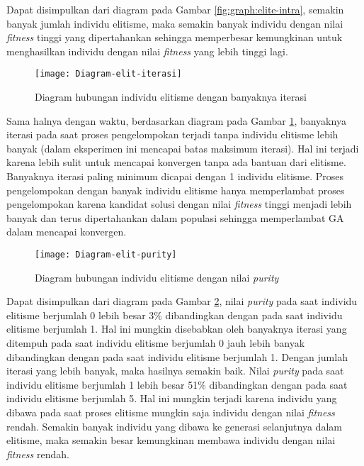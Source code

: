 \begin{enumerate}
		Dapat disimpulkan dari diagram pada Gambar \ref{fig:graph:elite-intra}, semakin banyak jumlah individu elitisme, maka semakin banyak individu dengan nilai \textit{fitness} tinggi yang dipertahankan sehingga memperbesar kemungkinan untuk menghasilkan individu dengan nilai \textit{fitness} yang lebih tinggi lagi.
		
		\begin{figure}[H]
			\centering
			\texttt{[image: Diagram-elit-iterasi]}
			\caption{Diagram hubungan individu elitisme dengan banyaknya iterasi}
			\label{fig:graph:elite-iteration}
		\end{figure}
		
		Sama halnya dengan waktu, berdasarkan diagram pada Gambar \ref{fig:graph:elite-iteration}, banyaknya iterasi pada saat proses pengelompokan terjadi tanpa individu elitisme lebih banyak (dalam eksperimen ini mencapai batas maksimum iterasi). Hal ini terjadi karena lebih sulit untuk mencapai konvergen tanpa ada bantuan dari elitisme. Banyaknya iterasi paling minimum dicapai dengan 1 individu elitisme. Proses pengelompokan dengan banyak individu elitisme hanya memperlambat proses pengelompokan karena kandidat solusi dengan nilai \textit{fitness} tinggi menjadi lebih banyak dan terus dipertahankan dalam populasi sehingga memperlambat GA dalam mencapai konvergen.
		
		\begin{figure}[H]
			\centering
			\texttt{[image: Diagram-elit-purity]}
			\caption{Diagram hubungan individu elitisme dengan nilai \textit{purity}}
			\label{fig:graph:elite-purity}
		\end{figure}
		
		Dapat disimpulkan dari diagram pada Gambar \ref{fig:graph:elite-purity}, nilai \textit{purity} pada saat individu elitisme berjumlah 0 lebih besar 3\% dibandingkan dengan pada saat individu elitisme berjumlah 1. Hal ini mungkin disebabkan oleh banyaknya iterasi yang ditempuh pada saat individu elitisme berjumlah 0 jauh lebih banyak dibandingkan dengan pada saat individu elitisme berjumlah 1. Dengan jumlah iterasi yang lebih banyak, maka hasilnya semakin baik. Nilai \textit{purity} pada saat individu elitisme berjumlah 1 lebih besar 51\% dibandingkan dengan pada saat individu elitisme berjumlah 5. Hal ini mungkin terjadi karena individu yang dibawa pada saat proses elitisme mungkin saja individu dengan nilai \textit{fitness} rendah. Semakin banyak individu yang dibawa ke generasi selanjutnya dalam elitisme, maka semakin besar kemungkinan membawa individu dengan nilai \textit{fitness} rendah.
\end{enumerate}

